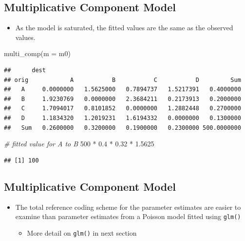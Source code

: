 \documentclass[
]{book}
\newenvironment{Shaded}{\begin{snugshade}}{\end{snugshade}}
\newcommand{\AttributeTok}[1]{\textcolor[rgb]{0.77,0.63,0.00}{#1}}
\newcommand{\CommentTok}[1]{\textcolor[rgb]{0.56,0.35,0.01}{\textit{#1}}}
\newcommand{\DecValTok}[1]{\textcolor[rgb]{0.00,0.00,0.81}{#1}}
\newcommand{\FloatTok}[1]{\textcolor[rgb]{0.00,0.00,0.81}{#1}}
\newcommand{\FunctionTok}[1]{\textcolor[rgb]{0.00,0.00,0.00}{#1}}
\newcommand{\NormalTok}[1]{#1}
\newcommand{\SpecialCharTok}[1]{\textcolor[rgb]{0.00,0.00,0.00}{#1}}
\providecommand{\tightlist}{%
  \setlength{\itemsep}{0pt}\setlength{\parskip}{0pt}}
\begin{document}
\hypertarget{multiplicative-component-model-4}{%
\subsection{Multiplicative Component Model}\label{multiplicative-component-model-4}}

\begin{itemize}
\tightlist
\item
  As the model is saturated, the fitted values are the same as the observed values.
\end{itemize}

\begin{Shaded}
\begin{Highlighting}[]
\FunctionTok{multi\_comp}\NormalTok{(}\AttributeTok{m =}\NormalTok{ m0)}
\end{Highlighting}
\end{Shaded}

\begin{verbatim}
##      dest
## orig            A           B           C           D         Sum
##   A     0.0000000   1.5625000   0.7894737   1.5217391   0.4000000
##   B     1.9230769   0.0000000   2.3684211   0.2173913   0.2000000
##   C     1.7094017   0.8101852   0.0000000   1.2882448   0.2700000
##   D     1.1834320   1.2019231   1.6194332   0.0000000   0.1300000
##   Sum   0.2600000   0.3200000   0.1900000   0.2300000 500.0000000
\end{verbatim}

\begin{Shaded}
\begin{Highlighting}[]
\CommentTok{\# fitted value for A to B}
\DecValTok{500} \SpecialCharTok{*} \FloatTok{0.4} \SpecialCharTok{*} \FloatTok{0.32} \SpecialCharTok{*} \FloatTok{1.5625}
\end{Highlighting}
\end{Shaded}

\begin{verbatim}
## [1] 100
\end{verbatim}

\hypertarget{multiplicative-component-model-5}{%
\subsection{Multiplicative Component Model}\label{multiplicative-component-model-5}}

\begin{itemize}
\tightlist
\item
  The total reference coding scheme for the parameter estimates are easier to examine than parameter estimates from a Poisson model fitted using \texttt{glm()}

  \begin{itemize}
  \tightlist
  \item
    More detail on \texttt{glm()} in next section
  \end{itemize}
\end{itemize}
\end{document}
